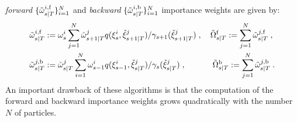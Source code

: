 \emph{forward} $\{ \tilde{\omega}_{s|T}^{i, \mathrm{f}} \}_{i=1}^N$ and \emph{backward} $\{ \tilde{\omega}_{s|T}^{i, \mathrm{b}} \}_{i=1}^N$ importance weights are given by:
\begin{align}
\label{eq:definition-smoothing-weight-forward}
&\tilde{\omega}_{s|T}^{i, \mathrm{f}} := \omega_{s}^{i} \sum_{j=1}^N {\check{\omega}}_{s+1|T}^{j} q(\xi_{s}^{i},{\check{\xi}}_{s+1|T}^{j})/\gamma_{s+1}({\check{\xi}}_{s+1|T}^{j})\;,\quad \tilde{\Omega}^{\mathrm{f}}_{s|T}:=\sum_{j=1}^N \tilde{\omega}_{s|T}^{j, \mathrm{f}}\;, \\
\label{eq:definition-smoothing-weight-backward}
&\tilde{\omega}_{s|T}^{j, \mathrm{b}} := {\check{\omega}}_{s|T}^{j} \sum_{i=1}^N \omega_{s-1}^{i} q(\xi_{s-1}^{i},{\check{\xi}}_{s|T}^{j})/\gamma_{s}({\check{\xi}}_{s|T}^{j})\;,\quad \hspace{.8cm}\tilde{\Omega}^{\mathrm{b}}_{s|T}:=\sum_{j=1}^N \tilde{\omega}_{s|T}^{j, \mathrm{b}} \;.
\end{align}
An important drawback of these algorithms is that the computation of the forward and backward importance weights grows quadratically with the number $N$ of particles.


